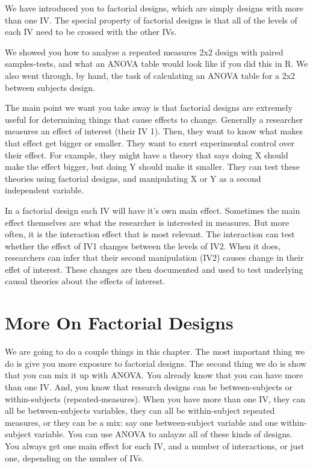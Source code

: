 \documentclass[]{book}
\begin{document}
We have introduced you to factorial designs, which are simply designs with more than one IV. The special property of factorial designs is that all of the levels of each IV need to be crossed with the other IVs.

We showed you how to analyse a repeated measures 2x2 design with paired samples-tests, and what an ANOVA table would look like if you did this in R. We also went through, by hand, the task of calculating an ANOVA table for a 2x2 between subjects design.

The main point we want you take away is that factorial designs are extremely useful for determining things that cause effects to change. Generally a researcher measures an effect of interest (their IV 1). Then, they want to know what makes that effect get bigger or smaller. They want to exert experimental control over their effect. For example, they might have a theory that says doing X should make the effect bigger, but doing Y should make it smaller. They can test these theories using factorial designs, and manipulating X or Y as a second independent variable.

In a factorial design each IV will have it's own main effect. Sometimes the main effect themselves are what the researcher is interested in measures. But more often, it is the interaction effect that is most relevant. The interaction can test whether the effect of IV1 changes between the levels of IV2. When it does, researchers can infer that their second manipulation (IV2) causes change in their effet of interest. These changes are then documented and used to test underlying causal theories about the effects of interest.

\hypertarget{more-on-factorial-designs}{%
\chapter{More On Factorial Designs}\label{more-on-factorial-designs}}

We are going to do a couple things in this chapter. The most important thing we do is give you more exposure to factorial designs. The second thing we do is show that you can mix it up with ANOVA. You already know that you can have more than one IV. And, you know that research designs can be between-subjects or within-subjects (repeated-measures). When you have more than one IV, they can all be between-subjects variables, they can all be within-subject repeated measures, or they can be a mix: say one between-subject variable and one within-subject variable. You can use ANOVA to anlayze all of these kinds of designs. You always get one main effect for each IV, and a number of interactions, or just one, depending on the number of IVs.
\end{document}
